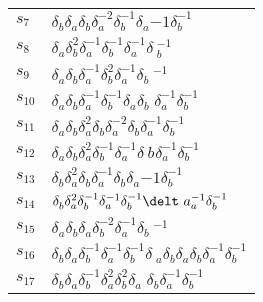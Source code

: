 \documentclass{article}
\begin{document}
\begin{center}
\begin{tabular}{ll}
$s_{7}$ & $\delta_b^{}\delta_a^{}\delta_b^{}\delta_a^{-2}\delta_b^{-1}\delta_a^\
{-1}\delta_b^{-1}$ \\
$s_{8}$ & $\delta_a^{}\delta_b^{2}\delta_a^{-1}\delta_b^{-1}\delta_a^{-1}\delta\
_b^{-1}$ \\
$s_{9}$ & $\delta_a^{}\delta_b^{}\delta_a^{-1}\delta_b^{2}\delta_a^{-1}\delta_b\
^{-1}$ \\
$s_{10}$ & $\delta_a^{}\delta_b^{}\delta_a^{-1}\delta_b^{-1}\delta_a^{}\delta_b\
^{}\delta_a^{-1}\delta_b^{-1}$ \\
$s_{11}$ & $\delta_a^{}\delta_b^{}\delta_a^{2}\delta_b^{}\delta_a^{-2}\delta_b^\
{}\delta_a^{-1}\delta_b^{-1}$ \\
$s_{12}$ & $\delta_a^{}\delta_b^{}\delta_a^{2}\delta_b^{-1}\delta_a^{-1}\delta_\
b^{}\delta_a^{-1}\delta_b^{-1}$ \\
$s_{13}$ & $\delta_b^{}\delta_a^{2}\delta_b^{}\delta_a^{-1}\delta_b^{}\delta_a^\
{-1}\delta_b^{-1}$ \\
$s_{14}$ & $\delta_b^{}\delta_a^{2}\delta_b^{-1}\delta_a^{-1}\delta_b^{-1}\delt\
a_a^{-1}\delta_b^{-1}$ \\
$s_{15}$ & $\delta_a^{}\delta_b^{}\delta_a^{}\delta_b^{-2}\delta_a^{-1}\delta_b\
^{-1}$ \\
$s_{16}$ & $\delta_b^{}\delta_a^{}\delta_b^{-1}\delta_a^{-1}\delta_b^{-1}\delta\
_a^{}\delta_b^{}\delta_a^{}\delta_b^{}\delta_a^{-1}\delta_b^{-1}$ \\
$s_{17}$ & $\delta_b^{}\delta_a^{}\delta_b^{-1}\delta_a^{2}\delta_b^{2}\delta_a\
^{}\delta_b^{}\delta_a^{-1}\delta_b^{-1}$ \\
\bottomrule
\end{tabular}
\end{center}

\thispagestyle{empty}
\end{document}
